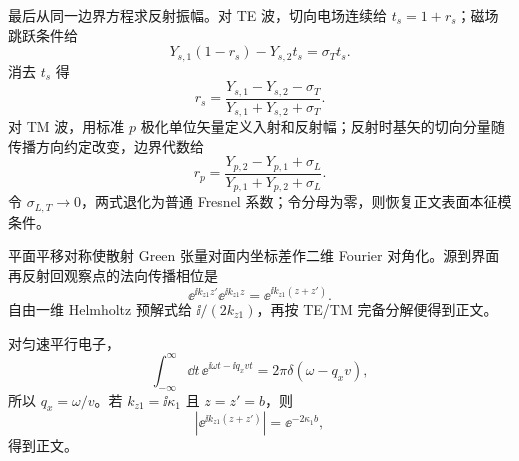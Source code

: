\begin{derivation}[各向异性导电薄层的模式极点]
最后从同一边界方程求反射振幅。对 TE 波，切向电场连续给 $t_s=1+r_s$；磁场跳跃条件给
\[
Y_{s,1}(1-r_s)-Y_{s,2}t_s=\sigma_Tt_s.
\]
消去 $t_s$ 得
\[
r_s=\frac{Y_{s,1}-Y_{s,2}-\sigma_T}{Y_{s,1}+Y_{s,2}+\sigma_T}.
\]
对 TM 波，用标准 $p$ 极化单位矢量定义入射和反射幅；反射时基矢的切向分量随传播方向约定改变，边界代数给
\[
r_p=\frac{Y_{p,2}-Y_{p,1}+\sigma_L}{Y_{p,1}+Y_{p,2}+\sigma_L}.
\]
令 $\sigma_{L,T}\to0$，两式退化为普通 Fresnel 系数；令分母为零，则恢复正文表面本征模条件。

平面平移对称使散射 Green 张量对面内坐标差作二维 Fourier 对角化。源到界面再反射回观察点的法向传播相位是
\[
\ee^{\ii k_{z1}z'}\ee^{\ii k_{z1}z}=\ee^{\ii k_{z1}(z+z')}.
\]
自由一维 Helmholtz 预解式给 $\ii/(2k_{z1})$，再按 TE/TM 完备分解便得到正文。

对匀速平行电子，
\[
\int_{-\infty}^{\infty}\dd t\,\ee^{\ii\omega t-\ii q_xvt}
=2\pi\delta(\omega-q_xv),
\]
所以 $q_x=\omega/v$。若 $k_{z1}=\ii\kappa_1$ 且 $z=z'=b$，则
\[
\left|\ee^{\ii k_{z1}(z+z')}\right|=\ee^{-2\kappa_1b},
\]
得到正文。
\end{derivation}

